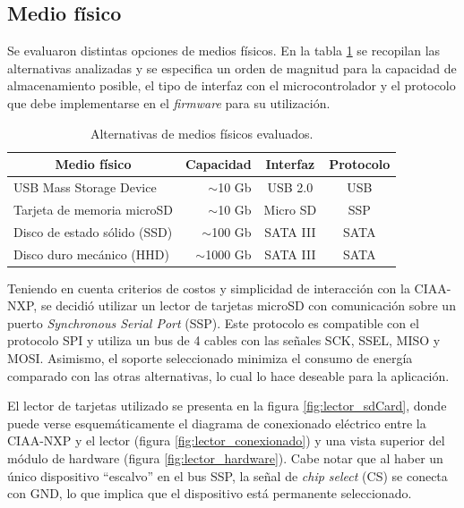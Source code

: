 \subsection{Medio físico}
\label{subsec:mediofisico}

Se evaluaron distintas opciones de medios físicos.  En la tabla \ref{tab:medios} se recopilan las alternativas analizadas y se especifica un orden de magnitud para la capacidad de almacenamiento posible, el tipo de interfaz con el microcontrolador y el protocolo que debe implementarse en el \textit{firmware} para su utilización.

\vspace{10px}

\begin{table}[ht]
\centering
\caption{Alternativas de medios físicos evaluados.}
\label{tab:medios}
\begin{tabular}{lrcc}
\toprule
\multicolumn{1}{c}{\textbf{Medio físico}} & \multicolumn{1}{c}{\textbf{Capacidad}} & \textbf{Interfaz} & \textbf{Protocolo} \\ \midrule
USB Mass Storage Device                   & $\sim$10 Gb                            & USB 2.0           & USB                \\
Tarjeta de memoria microSD                & $\sim$10 Gb                            & Micro SD          & SSP                \\
Disco de estado sólido (SSD)              & $\sim$100 Gb                           & SATA III          & SATA               \\
Disco duro mecánico (HHD)                 & $\sim$1000 Gb                          & SATA III          & SATA               \\ \bottomrule
\end{tabular}
\end{table}

\vspace{10px}

Teniendo en cuenta criterios de costos y simplicidad de interacción con la CIAA-NXP, se decidió utilizar un lector de tarjetas microSD con comunicación sobre un puerto \textit{Synchronous Serial Port} (SSP).  Este protocolo es compatible con el protocolo SPI y utiliza un bus de 4 cables con las señales SCK, SSEL, MISO y MOSI.  Asimismo, el soporte seleccionado minimiza el consumo de energía comparado con las otras alternativas, lo cual lo hace deseable para la aplicación.  

El lector de tarjetas utilizado se presenta en la figura \ref{fig:lector_sdCard}, donde puede verse esquemáticamente el diagrama de conexionado eléctrico entre la CIAA-NXP y el lector (figura \ref{fig:lector_conexionado}) y una vista superior del módulo de hardware (figura \ref{fig:lector_hardware}). Cabe notar que al haber un único dispositivo ``escalvo'' en el bus SSP, la señal de \textit{chip select} (CS) se conecta con GND, lo que implica que el dispositivo está permanente seleccionado.


